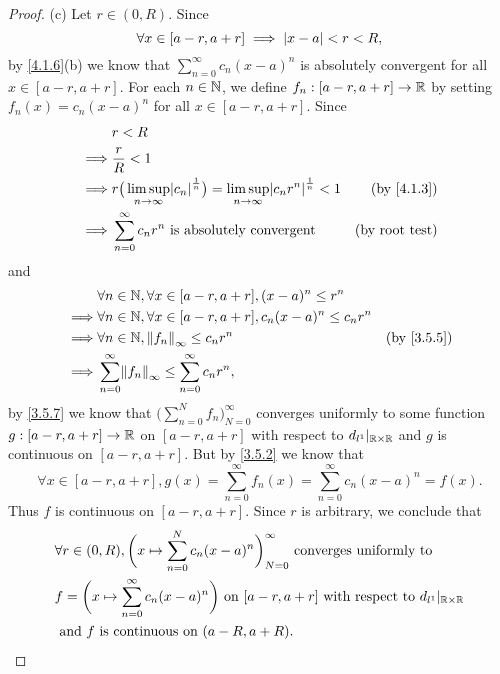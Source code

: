 \begin{proof}{(c)}
  Let \(r \in (0, R)\).
  Since
  \[
    \forall x \in [a - r, a + r] \implies \left\lvert x - a\right\rvert < r < R,
  \]
  by \cref{4.1.6}(b) we know that \(\sum_{n = 0}^\infty c_n (x - a)^n\) is absolutely convergent for all \(x \in [a - r, a + r]\).
  For each \(n \in \mathbb{N}\), we define \(f_n : [a - r, a + r] \to \mathbb{R}\) by setting \(f_n(x) = c_n (x - a)^n\) for all \(x \in [a - r, a + r]\).
  Since
  \begin{align*}
             & r < R                                                                                                                                          \\
    \implies & \frac{r}{R} < 1                                                                                                                                \\
    \implies & r \big(\limsup_{n \to \infty} \abs{c_n}^{\frac{1}{n}}\big) = \limsup_{n \to \infty} \abs{c_n r^n}^{\frac{1}{n}} < 1 & \text{(by \cref{4.1.3})} \\
    \implies & \sum_{n = 0}^\infty c_n r^n \text{ is absolutely convergent}                                                        & \text{(by root test)}
  \end{align*}
  and
  \begin{align*}
             & \forall n \in \N, \forall x \in [a - r, a + r], (x - a)^n \leq r^n                                    \\
    \implies & \forall n \in \N, \forall x \in [a - r, a + r], c_n (x - a)^n \leq c_n r^n                            \\
    \implies & \forall n \in \N, \norm*{f_n}_\infty \leq c_n r^n                          & \text{(by \cref{3.5.5})} \\
    \implies & \sum_{n = 0}^\infty \norm*{f_n}_\infty \leq \sum_{n = 0}^\infty c_n r^n,
  \end{align*}
  by \cref{3.5.7} we know that \(\big(\sum_{n = 0}^N f_n\big)_{N = 0}^\infty\) converges uniformly to some function \(g : [a - r, a + r] \to \mathbb{R}\) on \([a - r, a + r]\) with respect to \(d_{l^1}|_{\mathbb{R} \times \mathbb{R}}\) and \(g\) is continuous on \([a - r, a + r]\).
  But by \cref{3.5.2} we know that
  \[
    \forall x \in [a - r, a + r], g(x) = \sum_{n = 0}^\infty f_n(x) = \sum_{n = 0}^\infty c_n (x - a)^n = f(x).
  \]
  Thus \(f\) is continuous on \([a - r, a + r]\).
  Since \(r\) is arbitrary, we conclude that
  \begin{align*}
     & \forall r \in (0, R), \bigg(x \mapsto \sum_{n = 0}^N c_n (x - a)^n\bigg)_{N = 0}^\infty \text{ converges uniformly to }                 \\
     & f = \bigg(x \mapsto \sum_{n = 0}^\infty c_n (x - a)^n\bigg) \text{ on } [a - r, a + r] \text{ with respect to } d_{l^1}|_{\mathbb{R} \times \mathbb{R}} \\
     & \text{ and } f \text{ is continuous on } (a - R, a + R).
  \end{align*}
\end{proof}

